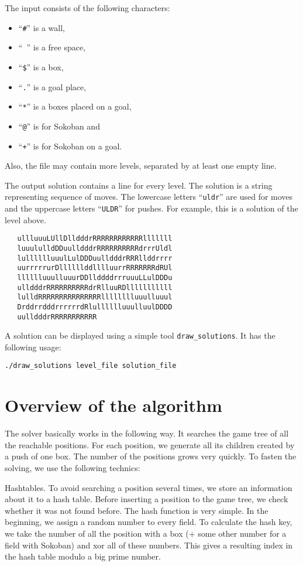 \documentclass[twocolumn]{article}
\newcommand{\heading}[1]{\smallbreak\par\noindent\hbox{\mybf #1}}
\begin{document}
The input consists of the following characters:
\begin{itemize}
\item ``\verb|#|'' is a wall,
\item ``\verb| |'' is a free space,
\item ``\verb|$|'' is a box,
\item ``\verb|.|'' is a goal place,
\item ``\verb|*|'' is a boxes placed on a goal,
\item ``\verb|@|'' is for Sokoban and
\item ``\verb|+|'' is for Sokoban on a goal.
\end{itemize}
Also, the file may contain more levels, separated by at least one empty line.

The output solution contains a line for every level. The solution is a string representing sequence of moves. The lowercase letters ``\verb|uldr|'' are
used for moves and the uppercase letters ``\verb|ULDR|'' for pushes. For example, this is a solution of the level above.
\begin{verbatim}
   ullluuuLUllDlldddrRRRRRRRRRRRRlllllll
   luuululldDDuulldddrRRRRRRRRRRdrrrUldl
   lulllllluuulLulDDDuulldddrRRRllddrrrr
   uurrrrrurDllllllddlllluurrRRRRRRRdRUl
   lllllluuulluuurDDllddddrrruuuLLulDDDu
   ulldddrRRRRRRRRRRdrRlluuRDlllllllllll
   lulldRRRRRRRRRRRRRRRlllllllluuulluuul
   DrddrrdddrrrrrrdRlulllllluuulluulDDDD
   uulldddrRRRRRRRRRRR
\end{verbatim}

A solution can be displayed using a simple tool \verb|draw_solutions|. It has the following usage:
\begin{verbatim}
./draw_solutions level_file solution_file
\end{verbatim}

\section{Overview of the algorithm}

The solver basically works in the following way. It searches the game tree of all the reachable positions. For each position, we generate all its
children created by a push of one box. The number of the positions grows very quickly. To fasten the solving, we use the following technics:

\heading{Hashtables.} To avoid searching a position several times, we store an information about it to a hash table. Before inserting a position to
the game tree, we check whether it was not found before. The hash function is very simple. In the beginning, we assign a random number to every field. To
calculate the hash key, we take the number of all the position with a box (+ some other number for a field with Sokoban) and xor all of these numbers.
This gives a resulting index in the hash table modulo a big prime number.
\end{document}
